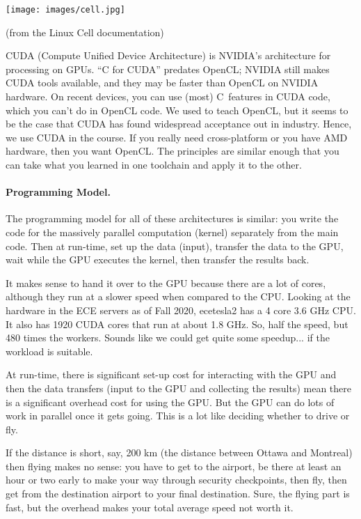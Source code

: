 \documentclass[a4paper]{report}
\newcommand{\CPP}{C\nolinebreak\hspace{-.05em}\raisebox{.4ex}{\tiny\bf +}\nolinebreak\hspace{-.10em}\raisebox{.4ex}{\tiny\bf +}}
\def\CPP{{C\nolinebreak[4]\hspace{-.05em}\raisebox{.4ex}{\tiny\bf ++}}}
\begin{document}
\begin{center}
\texttt{[image: images/cell.jpg]}
\end{center}
\hfill (from the Linux Cell documentation)

CUDA (Compute Unified Device Architecture) is NVIDIA's architecture
for processing on GPUs. ``C for CUDA'' predates OpenCL; NVIDIA still
makes CUDA tools available, and they may be faster than OpenCL on NVIDIA
hardware. On recent devices, you can use (most) \CPP~features in CUDA code,
which you can't do in OpenCL code. We used to teach OpenCL, but it seems
to be the case that CUDA has found widespread acceptance out in industry.
Hence, we use CUDA in the course. If you really need cross-platform or 
you have AMD hardware, then you want OpenCL. The principles are similar 
enough that you can take what you learned in one toolchain and apply it 
to the other.

\paragraph{Programming Model.} The programming
model for all of these architectures is similar: you write the code for
the massively parallel computation (kernel) separately from the main
code. Then at run-time, set up the data (input), transfer the data to the GPU, wait while the GPU executes the kernel, then transfer the results back. 

It makes sense to hand it over to the GPU because there are a lot of cores, although they run at a slower speed when compared to the CPU. Looking at the hardware in the ECE servers as of Fall 2020, ecetesla2 has a 4 core 3.6 GHz CPU. It also has 1920 CUDA cores that run at about 1.8 GHz. So, half the speed, but 480 times the workers. Sounds like we could get quite some speedup... if the workload is suitable.

At run-time, there is significant set-up cost for interacting with the GPU and then the data transfers (input to the GPU and collecting the results) mean there is a significant overhead cost for using the GPU. But the GPU can do lots of work in parallel once it gets going. This is a lot like deciding whether to drive or fly. 

If the distance is short, say, 200 km (the distance between Ottawa and Montreal) then flying makes no sense: you have to get to the airport, be there at least an hour or two early to make your way through security checkpoints, then fly, then get from the destination airport to your final destination. Sure, the flying part is fast, but the overhead makes your total average speed not worth it.
\end{document}
